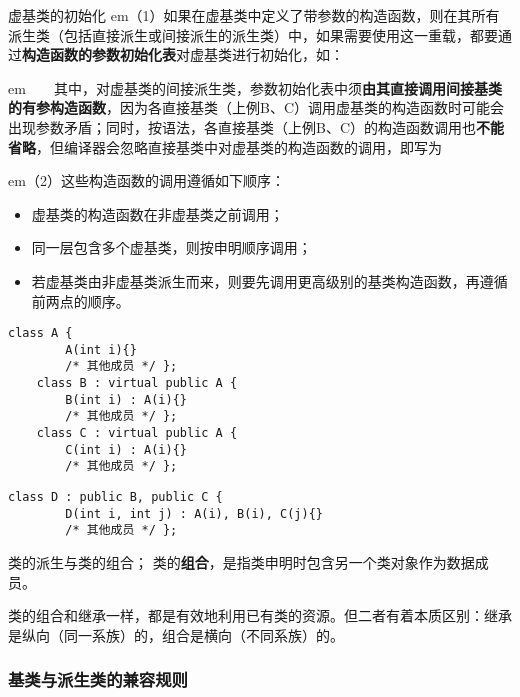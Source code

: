 \documentclass[10pt, a4paper, oneside, fontset=none]{ctexart}
\theoremstyle{plain}
\theoremstyle{definition}
\newcommand{\hang}[1][1]{\hangafter 1 \hangindent #1em}
\newcommand{\zhu}[2][]{\begin{note}{#1}\xiu #2\end{note}}
\newcommand{\tboqi}[1]{\textbf{\xiu\color{qinglv!75!black}#1}}
\begin{document}
\newpage
\zhu[虚基类的初始化]{
	\hang[2]（1）如果在虚基类中定义了带参数的构造函数，则在其所有派生类（包括直接派生或间接派生的派生类）中，如果需要使用这一重载，都要通过\tboqi{构造函数的参数初始化表}对虚基类进行初始化，如：

	\vspace{8\baselineskip}

	\hang[2]　　其中，对虚基类的间接派生类，参数初始化表中须\tboqi{由其直接调用间接基类的有参构造函数}，因为各直接基类（上例B、C）调用虚基类的构造函数时可能会出现参数矛盾；同时，按语法，各直接基类（上例B、C）的构造函数调用也\tboqi{不能省略}，但编译器会忽略直接基类中对虚基类的构造函数的调用，即写为

	\vspace{3.7\baselineskip}

	\hang[2]（2）这些构造函数的调用遵循如下顺序：
	\begin{itemize}[leftmargin=3em]
		\item 虚基类的构造函数在非虚基类之前调用；
		\item 同一层包含多个虚基类，则按申明顺序调用；
		\item 若虚基类由非虚基类派生而来，则要先调用更高级别的基类构造函数，再遵循前两点的顺序。
	\end{itemize}
}
\vspace{-21\baselineskip}
\begin{lstlisting}[style=notec, name=VirBase, xleftmargin=4.5em]
	class A {
		A(int i){}
		/* 其他成员 */ };
	class B : virtual public A {
		B(int i) : A(i){}
		/* 其他成员 */ };
	class C : virtual public A {
		C(int i) : A(i){}
		/* 其他成员 */ };
\end{lstlisting}
\vspace{3.5\baselineskip}
\begin{lstlisting}[style=notec, name=VirBase, xleftmargin=4.5em]
	class D : public B, public C {
		D(int i, int j) : A(i), B(i), C(j){}
		/* 其他成员 */ };
\end{lstlisting}
\vspace{4.5\baselineskip}
\zhu[类的派生与类的组合]{；
	类的\tboqi{组合}，是指类申明时包含另一个类对象作为数据成员。
	
	类的组合和继承一样，都是有效地利用已有类的资源。但二者有着本质区别：继承是纵向（同一系族）的，组合是横向（不同系族）的。
}

\subsubsection{基类与派生类的兼容规则}
\end{document}
